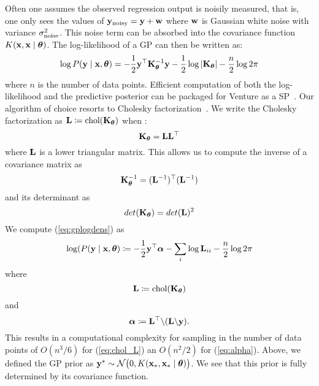 Often one assumes the observed regression output is noisily measured, that is,
one only sees the values of $\mathbf{y}_{\textrm{noisy}} = \mathbf{y} + \mathbf{w}$ where $\mathbf{w}$ is
Gaussian white noise with variance $\sigma_{\textrm{noise}}^2$. This noise term can be
absorbed into the covariance function $K(\mathbf{x},\mathbf{x} \mid \bm{\theta})$.
The log-likelihood of a \ac{GP} can then be written as:
\begin{equation}
\label{eq:gplogdens}
\log P(\mathbf{y} \mid \mathbf{x},\bm{\theta}) =
-\frac12 \mathbf{y}^\top 
\mathbf{K}_{\bm{\theta}}^{-1} \mathbf{y}
- \frac12\log \left\lvert \mathbf{K}_{\bm{\theta}} \right\rvert
- \frac{n}{2}\log 2\pi
\end{equation}
where $n$ is the number of data points.
Efficient computation of both the log-likelihood and the predictive posterior
can be packaged for Venture as a \ac{SP}~\citep{mansinghka2014venture}.
Our algorithm of choice resorts to Cholesky factorization~\citep[chap. 2]{rasmussen2006gaussian}.
We write the Cholesky factorization as 
$\mathbf{L}\coloneqq \text{chol}(\mathbf{K}_{\bm{\theta}})$ when
:
\begin{equation}
\mathbf{K}_{\bm{\theta}} = \mathbf{L}\mathbf{L}^\top
\end{equation}
where $\mathbf{L}$ is a lower triangular matrix. This allows us to compute the inverse of a covariance matrix as
\begin{equation}
\mathbf{K}_{\bm{\theta}}^{-1} = (\mathbf{L}^{-1})^\top (\mathbf{L}^{-1})
\end{equation}
and its determinant as 
\begin{equation}
det(\mathbf{K}_{\bm{\theta}}) = det(\mathbf{L})^2
\end{equation}
We compute (\ref{eq:gplogdens}) as
\begin{equation}
\log(P(\mathbf{y} \mid \mathbf{x}, \bm{\theta})\coloneqq - \frac{1}{2} \mathbf{y}^\top \bm{\alpha} - \sum_i \log \mathbf{L}_{ii} - \frac{n}{2} \log 2 \pi
\end{equation}
where 
\begin{equation}
\label{eq:chol_L}
\mathbf{L} \coloneqq \text{chol}(\mathbf{K}_{\bm{\theta}})
\end{equation}
and 
\begin{equation}
\label{eq:alpha}
\bm{\alpha} \coloneqq  \mathbf{L}^\top \backslash(\mathbf{L} \backslash \mathbf{y}). 
\end{equation}
This results in a computational complexity for sampling in the number of data points of $O(n^3/6)$ for (\ref{eq:chol_L}) an $O(n^2/2)$ for (\ref{eq:alpha}). 
Above, we defined the \ac{GP} prior as $\mathbf{y}^* \sim
\mathcal{N}\big(0,K(\mathbf{x}_*,\mathbf{x}_* \mid \bm{\theta} )\big)$.
We see that this prior is fully determined by its covariance function.
